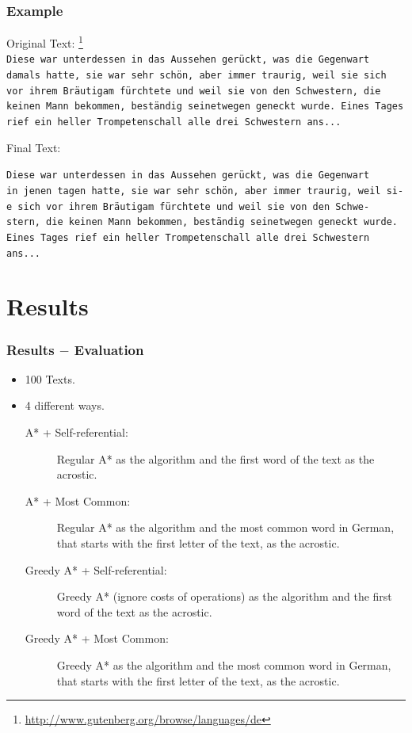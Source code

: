 \documentclass{beamer}
\begin{document}
\begin{frame}
\frametitle{Example}
Original Text: \footnote{\tiny \url{http://www.gutenberg.org/browse/languages/de}} \\
\texttt{\scriptsize Diese war unterdessen in das Aussehen gerückt, was die Gegenwart\\
damals hatte, sie war sehr schön, aber immer traurig, weil sie sich\\
vor ihrem Bräutigam fürchtete und weil sie von den Schwestern, die\\
keinen Mann bekommen, beständig seinetwegen geneckt wurde. Eines Tages\\
rief ein heller Trompetenschall alle drei Schwestern ans...\\
}

Final Text: \par

\texttt{\footnotesize{D}\scriptsize iese war unterdessen in das Aussehen gerückt, was die Gegenwart\\
\footnotesize{i}\scriptsize n jenen tagen hatte, sie war sehr schön, aber immer traurig, weil si-\\
\footnotesize{e}\scriptsize \ sich vor ihrem Bräutigam fürchtete und weil sie von den Schwe-\\
\footnotesize{s}\scriptsize tern, die keinen Mann bekommen, beständig seinetwegen geneckt wurde.\\
\footnotesize{E}\scriptsize ines Tages rief ein heller Trompetenschall alle drei Schwestern ans...\\}
\end{frame}


\section{Results}
\begin{frame}
\frametitle{Results $-$ Evaluation}
\begin{itemize}
	\item 100 Texts.
	\item 4 different ways.
		\begin{description}
			\item[A* + Self-referential:] Regular A* as the algorithm and the first word of the text as the acrostic.
			\item[A* + Most Common:] Regular A* as the algorithm and the most common word in German, that starts with the first letter of the text, as the acrostic.
			\item[Greedy A* + Self-referential:] Greedy A* (ignore costs of operations) as the algorithm and the first word of the text as the acrostic.
			\item[Greedy A* + Most Common:] Greedy A* as the algorithm and the most common word in German, that starts with the first letter of the text, as the acrostic.
		\end{description}
\end{itemize}
\end{frame}
\end{document}
